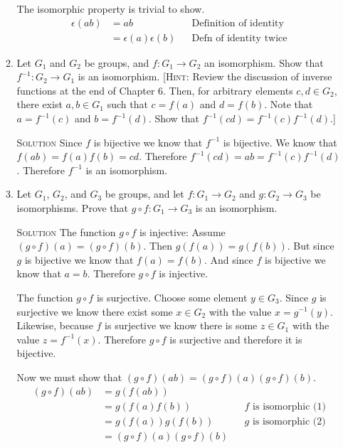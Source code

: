 \documentclass[twoside]{amsart}
\newcommand{\solution}{\textsc{Solution}\xspace}
\newcommand{\blank}{\vspace{5pt}}
\newcommand{\ind}{\hspace{.35in}}
\begin{document}
\begin{enumerate}[A.]
\begin{enumerate}[1]
   The isomorphic property is trivial to show. 
   \begin{align*}
       \epsilon(ab) &= ab && \text{Definition of identity} \\
                    &= \epsilon(a)\epsilon(b) && \text{Defn of identity twice}
   \end{align*}

   \item Let $G_1$ and $G_2$ be groups, and $f: G_1 \to G_2$ an isomorphism.
   Show that $f^{-1} : G_2 \to G_1$ is an isomorphism. [\textsc{Hint}:
   Review the discussion of inverse functions at the end of Chapter 6. Then,
   for arbitrary elements $c, d \in G_2$, there exist $a, b \in G_1$ such
   that $c = f(a)$ and $d = f(b)$. Note that $a = f^{-1}(c)$ and 
   $b = f^{-1}(d)$. Show that $f^{-1}(cd)=f^{-1}(c)f^{-1}(d)$.]

   \blank \noindent \solution Since $f$ is bijective we know that
   $f^{-1}$ is bijective. We know that $f(ab)=f(a)f(b)=cd$. Therefore
   $f^{-1}(cd)=ab=f^{-1}(c)f^{-1}(d)$. Therefore $f^{-1}$ is an isomorphism.

   \item Let $G_1$, $G_2$, and $G_3$ be groups, and let $f: G_1 \to G_2$ and
   $g:G_2 \to G_3$ be isomorphisms. Prove that $g \circ f : G_1 \to G_3$ is
   an isomorphism.

   \blank \noindent \solution The function $g \circ f$ is injective:
   Assume $(g \circ f)(a) = (g \circ f)(b)$. Then $g(f(a)) = g(f(b))$. But
   since $g$ is bijective we know that $f(a)=f(b)$. And since $f$ is
   bijective we know that $a=b$. Therefore $g \circ f$ is injective.

   \ind The function $g \circ f$ is surjective. Choose some element $y \in G_3$.
   Since $g$ is surjective we know there exist some $x \in G_2$ with
   the value $x = g^{-1}(y)$. Likewise, because $f$ is surjective
   we know there is some $z \in G_1$ with the value $z = f^{-1}(x)$. 
   Therefore $g \circ f$ is surjective and therefore it is bijective.

   Now we must show that $(g \circ f)(ab) = (g\circ f)(a)(g\circ f)(b)$.
   \begin{align}
      (g \circ f)(ab) &= g(f(ab))   \\
                      &= g(f(a)f(b))  && \text{$f$ is isomorphic (1)} \\
                      &= g(f(a)) g(f(b)) && \text{$g$ is isomorphic (2)} \\
                      &= (g \circ f)(a) (g\circ f)(b)
   \end{align}


\end{enumerate}
\end{enumerate}
\end{document}
